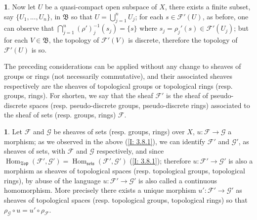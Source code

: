 \documentclass[12pt]{amsart}
\newcommand{\Hom}{\operatorname{Hom}}
\newcommand{\sets}{\operatorname{\mathfrak{sets}}}
\newcommand{\Top}{\operatorname{\mathfrak{Top}}}
\theoremstyle{definition}
\newtheorem{bk}[proposition]{}
\begin{document}
\begin{bk}
Now let $U$ be a quasi-compact open subspace of $X$, there exists a finite subset, say $\{U_{1},...,U_{n}\}$, in $\mathfrak{B}$ so that $U=\bigcup\limits_{j=1}^{n}U_{j}$; for each $s\in\mathscr{F}'(U)$, as before, one can observe that $\bigcap\limits_{j=1}^{n}(\rho')_{j}^{-1}(s_{j})=\{s\}$ where $s_{j}=\rho_{j}'(s)\in\mathscr{F}'(U_{j})$; but for each $V\in\mathfrak{B}$, the topology of $\mathscr{F}'(V)$ is discrete, therefore the topology of $\mathscr{F}'(U)$ is so.

The preceding considerations can be applied without any change to sheaves of groups or rings (not necessarily commutative), and their associated sheaves respectively are the sheaves of topological groups or topological rings (resp. groups, rings). For shorten, we say that the sheaf $\mathscr{F}'$ is the sheaf of pseudo-discrete spaces (resp. pseudo-discrete groups, pseudo-discrete rings) associated to the sheaf of sets (resp. groups, rings) $\mathscr{F}$.

\end{bk}

\begin{bk}\label{I: 3.8.2} Let $\mathscr{F}$ and $\mathscr{G}$ be sheaves of sets (resp. groups, rings) over $X$, $u:\mathscr{F}\rightarrow\mathscr{G}$ a morphism; as we observed in the above (\ref{I: 3.8.1}), we can identify $\mathscr{F}'$ and $\mathscr{G}'$, as sheaves of sets, with $\mathscr{F}$ and $\mathscr{G}$ respectively, and since $\Hom_{\Top}(\mathscr{F}',\mathscr{G}')=
\Hom_{\sets}(\mathscr{F}',\mathscr{G}')$ (\ref{I: 3.8.1});  therefore $u:\mathscr{F}'\rightarrow\mathscr{G}'$ is also a morphism as sheaves of topological spaces (resp. topological groups, topological rings), by abuse of the language $u:\mathscr{F}'\rightarrow\mathscr{G}'$ is also called a continuous homomorphism. More precisely there exists a unique morphism $u':\mathscr{F}'\rightarrow\mathscr{G}'$ as sheaves of topological spaces (resp. topological groups, topological rings) so that $\rho_{\mathcal{G}}\circ u=u'\circ\rho_{\mathcal{F}}$.

\end{bk}
\end{document}
